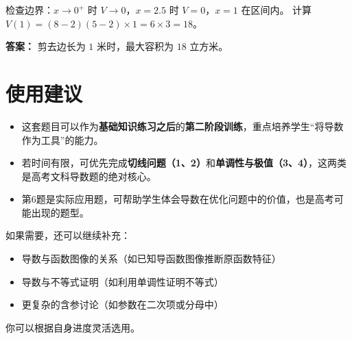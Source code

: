 \documentclass[10pt]{article}
\begin{document}
检查边界：$x \to 0^+$ 时 $V \to 0$，$x = 2.5$ 时 $V=0$，$x=1$ 在区间内。
计算 $V(1) = (8-2)(5-2) \times 1 = 6 \times 3 = 18$。

\textbf{答案：} 剪去边长为 $1$ 米时，最大容积为 $18$ 立方米。

\section*{使用建议}
\begin{itemize}
    \item 这套题目可以作为\textbf{基础知识练习之后}的\textbf{第二阶段训练}，重点培养学生“将导数作为工具”的能力。
    \item 若时间有限，可优先完成\textbf{切线问题（1、2）}和\textbf{单调性与极值（3、4）}，这两类是高考文科导数题的绝对核心。
    \item 第6题是实际应用题，可帮助学生体会导数在优化问题中的价值，也是高考可能出现的题型。
\end{itemize}

如果需要，还可以继续补充：
\begin{itemize}
    \item 导数与函数图像的关系（如已知导函数图像推断原函数特征）
    \item 导数与不等式证明（如利用单调性证明不等式）
    \item 更复杂的含参讨论（如参数在二次项或分母中）
\end{itemize}
你可以根据自身进度灵活选用。
\end{document}

